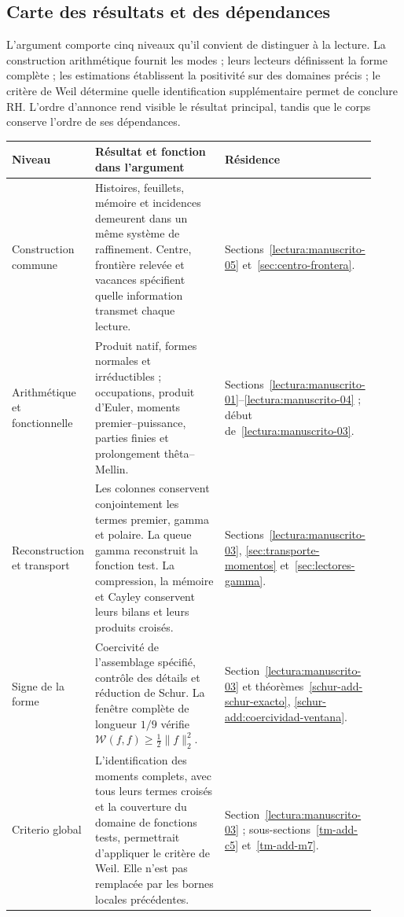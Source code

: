 \subsection*{Carte des résultats et des dépendances}
L’argument comporte cinq niveaux qu’il convient de distinguer à la lecture. La
construction arithmétique fournit les modes ; leurs lecteurs définissent la forme
complète ; les estimations établissent la positivité sur des domaines précis ; le
critère de Weil détermine quelle identification supplémentaire permet de conclure RH.
L’ordre d’annonce rend visible le résultat principal, tandis que le corps
conserve l’ordre de ses dépendances.

\begin{center}
\renewcommand{\arraystretch}{1.22}
\begin{tabular}{@{}p{0.21\linewidth}p{0.48\linewidth}p{0.23\linewidth}@{}}
\hline
\textbf{Niveau} & \textbf{Résultat et fonction dans l'argument} & \textbf{Résidence}\\
\hline
Construction commune &
Histoires, feuillets, mémoire et incidences demeurent dans un même système de raffinement. Centre, frontière relevée et vacances spécifient quelle information transmet chaque lecture. &
Sections~\ref{lectura:manuscrito-05} et~\ref{sec:centro-frontera}.\\
Arithmétique et fonctionnelle &
Produit natif, formes normales et irréductibles ; occupations, produit
d’Euler, moments premier--puissance, parties finies et prolongement thêta--Mellin. &
Sections~\ref{lectura:manuscrito-01}--\ref{lectura:manuscrito-04} ;
début de~\ref{lectura:manuscrito-03}.\\
Reconstruction et transport &
Les colonnes conservent conjointement les termes premier, gamma et polaire.
La queue gamma reconstruit la fonction test. La compression, la mémoire et Cayley
conservent leurs bilans et leurs produits croisés. &
Sections~\ref{lectura:manuscrito-03}, \ref{sec:transporte-momentos} et~\ref{sec:lectores-gamma}.\\
Signe de la forme &
Coercivité de l’assemblage spécifié, contrôle des détails et réduction de
Schur. La fenêtre complète de longueur \(1/9\) vérifie
\(\mathscr W(f,f)\geq\frac12\|f\|_2^2\). &
Section~\ref{lectura:manuscrito-03} et théorèmes~\ref{schur-add-schur-exacto}, \ref{schur-add:coercividad-ventana}.\\
Criterio global &
L'identification des moments complets, avec tous leurs termes croisés et la couverture du domaine de fonctions tests, permettrait d'appliquer le critère de Weil. Elle n'est pas remplacée par les bornes locales précédentes. &
Section~\ref{lectura:manuscrito-03} ;
sous-sections~\ref{tm-add-c5} et~\ref{tm-add-m7}.\\
\hline
\end{tabular}
\end{center}

